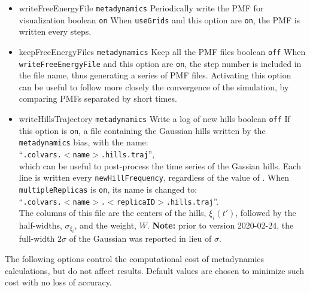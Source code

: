 \begin{itemize}

\item %
  \keydef
    {writeFreeEnergyFile}{%
    \texttt{metadynamics}}{%
    Periodically write the PMF for visualization}{%
    boolean}{%
    \texttt{on}}{%
    When \texttt{useGrids} and this option are \texttt{on}, the PMF is written every  steps.}

\item %
  \keydef
    {keepFreeEnergyFiles}{%
    \texttt{metadynamics}}{%
    Keep all the PMF files}{%
    boolean}{%
    \texttt{off}}{%
    When \texttt{writeFreeEnergyFile} and this option are \texttt{on}, the step number is included in the file name, thus generating a series of PMF files.
    Activating this option can be useful to follow more closely the convergence of the simulation, by comparing PMFs separated by short times.}

\item %
  \keydef
    {writeHillsTrajectory}{%
    \texttt{metadynamics}}{%
    Write a log of new hills}{%
    boolean}{%
    \texttt{off}}{%
    If this option is \texttt{on}, a file containing the Gaussian hills written by the \texttt{metadynamics} bias, with the name:\\
    ``\outputName\texttt{.colvars.$<$name$>$.hills.traj}'',\\
    which can be useful to post-process the time series of the Gassian hills.
    Each line is written every \texttt{newHillFrequency}, regardless of the value of .
    When \texttt{multipleReplicas} is \texttt{on}, its name is changed to:\\
    ``\outputName\texttt{.colvars.$<$name$>$.$<$replicaID$>$.hills.traj}''.\\
    The columns of this file are the centers of the hills, $\xi_{i}(t')$, followed by the half-widths, $\sigma_{\xi_{i}}$, and the weight, $W$.
    \textbf{Note:} prior to version 2020-02-24, the full-width $2\sigma$ of the Gaussian was reported in lieu of $\sigma$.
    }

\end{itemize}


The following options control the computational cost of metadynamics calculations, but do not affect results.
Default values are chosen to minimize such cost with no loss of accuracy.

